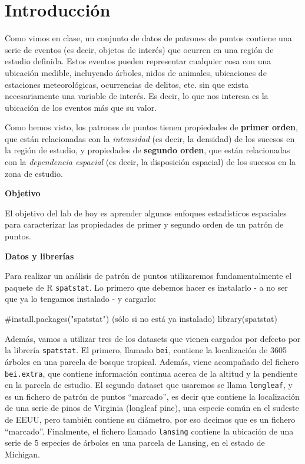 \documentclass[
  letterpaper,
  DIV=11,
  numbers=noendperiod]{scrreprt}
\newenvironment{Shaded}{\begin{snugshade}}{\end{snugshade}}
\newcommand{\CommentTok}[1]{\textcolor[rgb]{0.37,0.37,0.37}{#1}}
\newcommand{\FunctionTok}[1]{\textcolor[rgb]{0.28,0.35,0.67}{#1}}
\newcommand{\NormalTok}[1]{\textcolor[rgb]{0.00,0.23,0.31}{#1}}
\begin{document}
\hypertarget{introducciuxf3n-2}{%
\section{Introducción}\label{introducciuxf3n-2}}

Como vimos en clase, un conjunto de datos de patrones de puntos contiene
una serie de eventos (es decir, objetos de interés) que ocurren en una
región de estudio definida. Estos eventos pueden representar cualquier
cosa con una ubicación medible, incluyendo árboles, nidos de animales,
ubicaciones de estaciones meteorológicas, ocurrencias de delitos, etc.
sin que exista necesariamente una variable de interés. Es decir, lo que
nos interesa es la ubicación de los eventos más que su valor.

Como hemos visto, los patrones de puntos tienen propiedades de
\textbf{primer orden}, que están relacionadas con la \emph{intensidad}
(es decir, la densidad) de los sucesos en la región de estudio, y
propiedades de \textbf{segundo orden}, que están relacionadas con la
\emph{dependencia espacial} (es decir, la disposición espacial) de los
sucesos en la zona de estudio.

\textbf{Objetivo}

El objetivo del lab de hoy es aprender algunos enfoques estadísticos
espaciales para caracterizar las propiedades de primer y segundo orden
de un patrón de puntos.

\textbf{Datos y librerías}

Para realizar un análisis de patrón de puntos utilizaremos
fundamentalmente el paquete de R \texttt{spatstat}. Lo primero que
debemos hacer es instalarlo - a no ser que ya lo tengamos instalado - y
cargarlo:

\begin{Shaded}
\begin{Highlighting}[]
\CommentTok{\#install.packages("spatstat") (sólo si no está ya instalado)}
\FunctionTok{library}\NormalTok{(spatstat)}
\end{Highlighting}
\end{Shaded}

Además, vamos a utilizar tres de los datasets que vienen cargados por
defecto por la librería \texttt{spatstat}. El primero, llamado
\texttt{bei}, contiene la localización de 3605 árboles en una parcela de
bosque tropical. Además, viene acompañado del fichero
\texttt{bei.extra}, que contiene información continua acerca de la
altitud y la pendiente en la parcela de estudio. El segundo dataset que
usaremos se llama \texttt{longleaf}, y es un fichero de patrón de puntos
``marcado'', es decir que contiene la localización de una serie de pinos
de Virginia (longleaf pine), una especie común en el sudeste de EEUU,
pero también contiene su diámetro, por eso decimos que es un fichero
``marcado''. Finalmente, el fichero llamado \texttt{lansing} contiene la
ubicación de una serie de 5 especies de árboles en una parcela de
Lansing, en el estado de Michigan.
\end{document}
